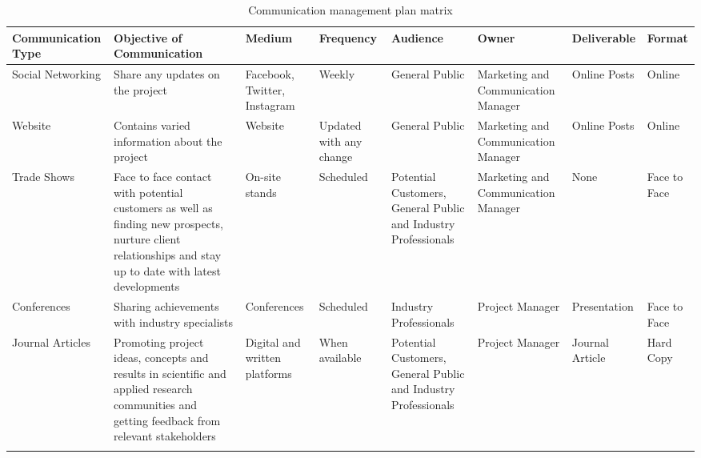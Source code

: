 \begin{landscape}
	
	\begin{longtable}{| >{\raggedright\arraybackslash}p{2.8cm}  | >{\raggedright\arraybackslash}p{2.8cm} | >{\raggedright\arraybackslash}p{2cm} | >{\raggedright\arraybackslash}p{2cm} | >{\raggedright\arraybackslash}p{2cm} | >{\raggedright\arraybackslash}p{2.4cm} | >{\raggedright\arraybackslash}p{2.4cm} | >{\raggedright\arraybackslash}p{2.4cm} |  }
		
		\toprule [2pt]
		
		\textbf{Communication Type} & \textbf{Objective of Communication} & \textbf{Medium}  &\textbf{Frequency} &\textbf{Audience}& \textbf{Owner}& \textbf{Deliverable} &\textbf{Format} \\  
		
		\midrule [1.5pt]
		\endhead
		
		Social Networking& Share any updates on the project  & Facebook, Twitter, Instagram   &Weekly   &General Public     &  Marketing and Communication Manager &Online Posts   &Online\\  
		
		\hline
		
		Website& Contains varied information about the project  &   Website &Updated with any change   &  General Public   &  Marketing and Communication Manager & Online Posts  &Online\\  
		
		\hline
		
		Trade Shows&Face to face contact with potential customers as well as finding new prospects, nurture client relationships and stay up to date with latest developments   &  On-site stands  & Scheduled  &  Potential Customers, General Public and Industry Professionals   &Marketing and Communication Manager   & None  &Face to Face\\  
		
		\hline
		
		Conferences& Sharing achievements with industry specialists  &  Conferences  &Scheduled   & Industry Professionals    & Project Manager  & Presentation  &Face to Face\\  
		
		\hline
		
		Journal Articles&Promoting project ideas, concepts and results in scientific and applied research communities and getting feedback from relevant stakeholders   &Digital and written platforms    &  When available &  Potential Customers, General Public and Industry Professionals   & Project Manager  & Journal Article  &Hard Copy\\  
		
		\bottomrule[2pt]
		
		\caption{Communication management plan matrix}
	\end{longtable}
	
	\vspace*{\fill}
		
\end{landscape}